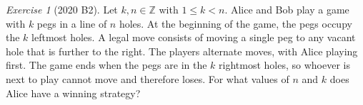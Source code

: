 \documentclass{article}
\theoremstyle{definition}
\theoremstyle{remark}
\newtheorem{exercise}{Exercise}
\newcommand{\ZZ}{\mathbb{Z}}
\begin{document}
    \begin{exercise}[2020 B2]
        Let \(k,n\in\ZZ\) with \(1\leq k<n\).
        Alice and Bob play a game with \(k\) pegs in a line of \(n\) holes.
        At the beginning of the game, the pegs occupy the \(k\) leftmost holes.
        A legal move consists of moving a single peg to any vacant hole that is further to the right.
        The players alternate moves, with Alice playing first.
        The game ends when the pegs are in the \(k\) rightmost holes, so whoever is next to play cannot move and therefore loses.
        For what values of \(n\) and \(k\) does Alice have a winning strategy?
    \end{exercise}
\end{document}
